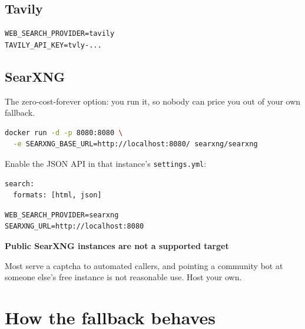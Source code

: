 \documentclass[11pt,a4paper]{report}
\newenvironment{callout}[1]
  {\begin{framed}\noindent\textbf{\textcolor{phcWarnInk}{#1}}\par\vspace{3pt}\small}
  {\end{framed}}
\begin{document}
\subsection*{Tavily}

\begin{lstlisting}[language=envfile]
WEB_SEARCH_PROVIDER=tavily
TAVILY_API_KEY=tvly-...
\end{lstlisting}

\subsection*{SearXNG}

The zero-cost-forever option: you run it, so nobody can price you out of your
own fallback.

\begin{lstlisting}[language=bash]
docker run -d -p 8080:8080 \
  -e SEARXNG_BASE_URL=http://localhost:8080/ searxng/searxng
\end{lstlisting}

Enable the JSON API in that instance's \texttt{settings.yml}:

\begin{lstlisting}
search:
  formats: [html, json]
\end{lstlisting}

\begin{lstlisting}[language=envfile]
WEB_SEARCH_PROVIDER=searxng
SEARXNG_URL=http://localhost:8080
\end{lstlisting}

\begin{callout}{Public SearXNG instances are not a supported target}
Most serve a captcha to automated callers, and pointing a community bot at
someone else's free instance is not reasonable use. Host your own.
\end{callout}

\section{How the fallback behaves}
\end{document}
